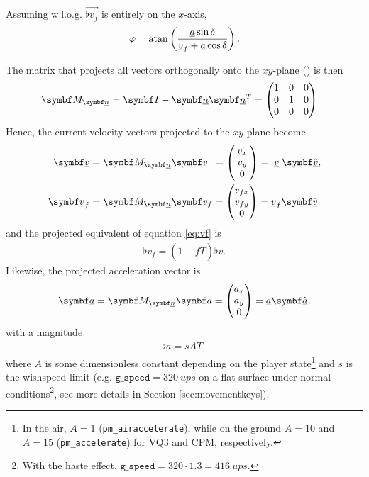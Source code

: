 Assuming w.l.o.g. $\vec{\flat{v}_f}$ is entirely on the $x$-axis,
\begin{align}
\label{eq:varphi}
\varphi = \atan\left(\frac{\flat{a}\sin\delta}{\flat{v}_f + \flat{a}\cos\delta} \right).
\end{align}

The matrix that projects all vectors orthogonally onto the $xy$-plane (\greenarea) is then
\begin{align*}
\resprojmat{\flat{n}} = \mat{I} - \vec{\flat{n}} \vec{\flat{n}}^T &=
\begin{pmatrix}
1 & 0 & 0\\
0 & 1 & 0\\
0 & 0 & 0
\end{pmatrix}
\end{align*}
Hence, the current velocity vectors projected to the $xy$-plane become
\begin{align*}
\vec{\flat{v}} &= \resprojmat{\flat{n}} \vec{v}\hphantom{_f} =
\begin{pmatrix}
\mathmakebox[\widthof{$v_{fx}$}]{v_x} \\ v_y \\0
\end{pmatrix} = \mathmakebox[\widthof{$\flat{v}_f$}]{\flat{v}} \uvec{\flat{v}},\\
\vec{\flat{v}}_f &= \resprojmat{\flat{n}} \vec{v}_f =
\begin{pmatrix}
v_{fx} \\ v_{fy} \\0
\end{pmatrix} = \flat{v}_f \uvec{\flat{v}}
\end{align*}
and the projected equivalent of equation \eqref{eq:vf} is
\begin{align}
\label{eq:flat_vf}
\flat{v}_f = (1 - \tilde{f}T) \flat{v}.
\end{align}
Likewise, the projected acceleration vector is
\begin{align}
\label{eq:accel_direction}
\vec{\flat{a}} = \resprojmat{\flat{n}} \vec{a} =
\begin{pmatrix}
a_x \\ a_y \\0
\end{pmatrix} = \flat{a} \uvec{\flat{a}},
\end{align}
with a magnitude
\begin{align}
\label{eq:sAT}
\flat{a} = sAT,
\end{align}
where $A$ is some dimensionless constant depending on the player state\footnote{In the air, $A = 1$ (\texttt{pm\_airaccelerate}), while on the ground $A = 10$ and $A = 15$ (\texttt{pm\_accelerate}) for VQ3 and CPM, respectively.} and $s$ is the wishspeed limit (e.g. $\texttt{g\_speed} = \qty{320}{ups}$ on a flat surface under normal conditions\footnote{With the haste effect, $\texttt{g\_speed} = 320\cdot 1.3 = \qty{416}{ups}$.}, see more details in Section \ref{sec:movementkeys}).\\
